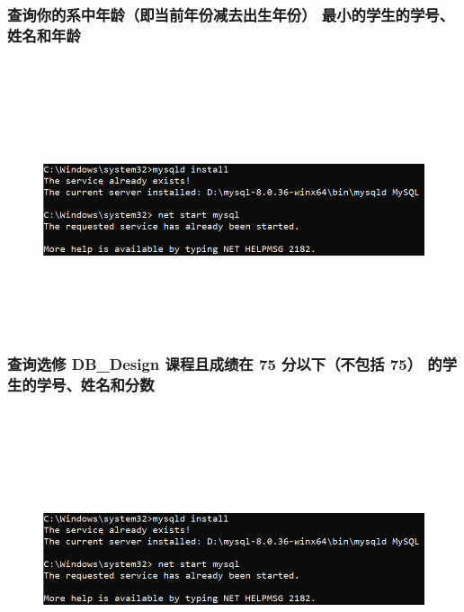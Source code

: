 \documentclass{ctexart}
\begin{document}
\subsubsection{查询你的系中年龄（即当前年份减去出生年份） 最小的学生的学号、姓名和年龄}
\begin{lstlisting}[language=sql]
	
\end{lstlisting}
\begin{figure}[H]
	\centering 
	\includegraphics[height=7cm,width=14cm]{1.png}
	\end{figure}
\subsubsection{查询选修 DB\_Design 课程且成绩在 75 分以下（不包括 75） 的学生的学号、姓名和分数}
\begin{lstlisting}[language=sql]
	
\end{lstlisting}
\begin{figure}[H]
	\centering 
	\includegraphics[height=7cm,width=14cm]{1.png}
	\end{figure}
\end{document}

